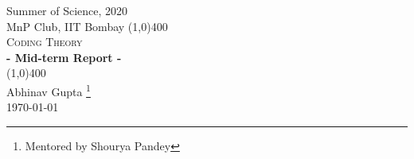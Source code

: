\documentclass[../main.tex]{subfiles}
\begin{document}
\begin{titlepage}
\begin{center}

\vspace{1cm}
\Large{\textsf{ Summer of Science, 2020 }} \\
\vspace{1.5mm}
\large{\textsf{ MnP Club, IIT Bombay }}
\vfill
\line(1,0){400} \\[2mm]
\Huge{\textsc{ Coding Theory }}\\[3mm]
\Large{\textbf{- Mid-term Report -}}\\[1mm]
\line(1,0){400} \\
\vfill
\textsf{Abhinav Gupta} \footnote{ Mentored by \textsf{Shourya Pandey} }\\
\textsf{\today} \\

\end{center}
\end{titlepage}
\end{document}
